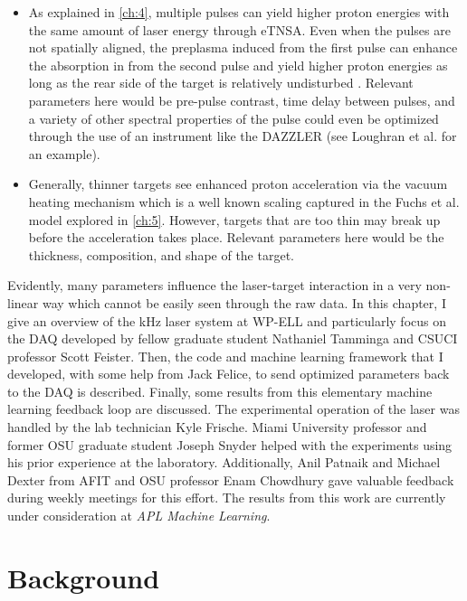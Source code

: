 \begin{itemize}
\item As explained in \autoref{ch:4}, multiple pulses can yield higher proton energies with the same amount of laser energy through \gls{eTNSA}. Even when the pulses are not spatially aligned, the preplasma induced from the first pulse can enhance the absorption in from the second pulse and yield higher proton energies as long as the rear side of the target is relatively undisturbed \cite{Macchi_2013_RevModPhys}. Relevant parameters here would be pre-pulse contrast, time delay between pulses, and a variety of other spectral properties of the pulse could even be optimized through the use of an instrument like the DAZZLER (see Loughran et al. \cite{Loughran_2023_HPLSE} for an example). 

\item Generally, thinner targets see enhanced proton acceleration via the vacuum heating mechanism which is a well known scaling captured in the Fuchs et al. \cite{Fuchs_2005_Nat} model explored in \autoref{ch:5}. However, targets that are too thin may break up before the acceleration takes place. Relevant parameters here would be the thickness, composition, and shape of the target. 
\end{itemize}
Evidently, many parameters influence the laser-target interaction in a very non-linear way which cannot be easily seen through the raw data. In this chapter, I give an overview of the kHz laser system at \gls{WP-ELL} and particularly focus on the \gls{DAQ} developed by fellow graduate student Nathaniel Tamminga and \gls{CSUCI} professor Scott Feister. Then, the code and machine learning framework that I developed, with some help from Jack Felice, to send optimized parameters back to the \gls{DAQ} is described. Finally, some results from this elementary machine learning feedback loop are discussed. The experimental operation of the laser was handled by the lab technician Kyle Frische. Miami University professor and former OSU graduate student Joseph Snyder helped with the experiments using his prior experience at the laboratory. Additionally, Anil Patnaik and Michael Dexter from AFIT and OSU professor Enam Chowdhury gave valuable feedback during weekly meetings for this effort. The results from this work are currently under consideration at \emph{APL Machine Learning}.

\section{Background} \label{sec:lab_background}

